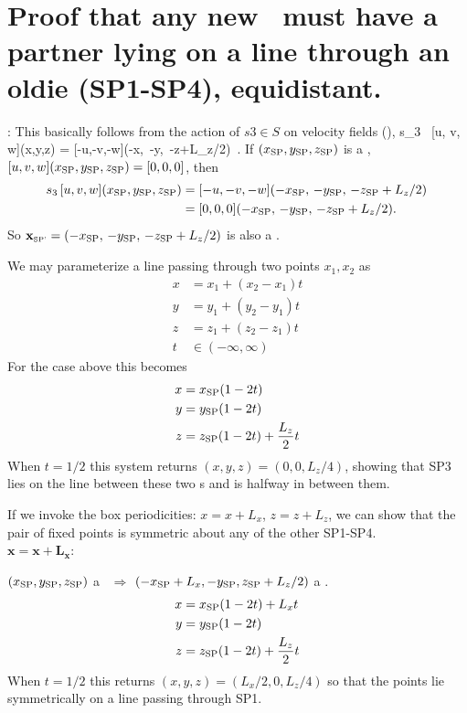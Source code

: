 \section{Proof that any new \stagp\ must have a partner lying on a line through an oldie (SP1-SP4), equidistant. }
 \label{sect:stagpairs}
 : This basically follows from the
 action of $s3 \in S$ on velocity fields (),
 \beq    s_3 \, [u, v, w](x,y,z) = [-u,-v,-w](-x,\, -y,\, -z+L_z/2)\nnu\, .
 \eeq
 If $(x_{{\text{SP}}},y_{{\text{SP}}},z_{{\text{SP}}})$ is a \stagp, $[u, v,
 w](x_{{\text{SP}}},y_{{\text{SP}}},z_{{\text{SP}}}) = [0,0,0]$, then
 \begin{align} s_3 \, [u, v, w](x_{{\text{SP}}},y_{{\text{SP}}},z_{{\text{SP}}}) &= [-u,-v,-w](-x_{{\text{SP}}},\, -y_{{\text{SP}}},\, -z_{{\text{SP}}}+L_z/2) \nonumber\, \\
 &= [0,0,0](-x_{{\text{SP}}},\, -y_{{\text{SP}}},\, -z_{{\text{SP}}}+L_z/2) .
 \end{align}
 So ${{\bf x}_{\text{\tiny SP'}}} =(-x_{{\text{SP}}},\, -y_{{\text{SP}}},\, -z_{{\text{SP}}}+L_z/2)$ is also a \stagp.

 \noindent We may parameterize a line passing through two points $x_{1},x_{2}$
 as
 \begin{align}
  x &= x_{1} + (x_{2} - x_{1})t \\
  y &= y_{1} + (y_{2} - y_{1})t \\
  z &= z_{1} + (z_{2} - z_{1})t \\
  t &\in (-\infty,\infty)
 \end{align}
 For the case above this becomes
 \begin{align}
  x &= x_{{\text{SP}}}(1-2t) \\
  y &= y_{{\text{SP}}}(1-2t) \\
  z &= z_{{\text{SP}}}(1-2t) + \frac{L_{z}}{2} t
 \end{align}
 When $t = 1/2$ this system returns $(x,y,z) = (0,0,L_{z}/4)$, showing
 that SP3 lies on the line between these two \stagp s and is halfway
 in between them.

 If we invoke the box periodicities: $x = x + L_{x}$, $z = z +
 L_{z}$, we can show that the pair of fixed points is symmetric
 about any of the other SP1-SP4. \\

 \noindent$\mathbf{x = x + L_{x}}$:

 \noindent$(x_{{\text{SP}}},y_{{\text{SP}}},z_{{\text{SP}}})$ a \stagp\ $\Rightarrow$
 $(-x_{{\text{SP}}}+L_{x},-y_{{\text{SP}}},z_{{\text{SP}}}+L_{z}/2)$ a \stagp.
 \begin{align}
  x &= x_{{\text{SP}}}(1-2t) + L_{x}t \\
  y &= y_{{\text{SP}}}(1-2t) \\
  z &= z_{{\text{SP}}}(1-2t) + \frac{L_{z}}{2} t
 \end{align}
 When $t = 1/2$ this returns $(x,y,z) = (L_{x}/2,0,L_{z}/4)$ so that the
 points lie symmetrically on a line passing through SP1. \\

